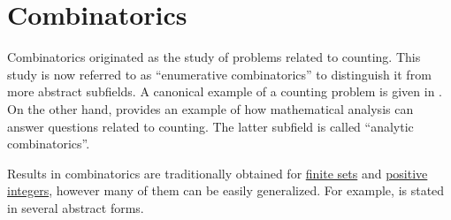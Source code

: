 \chapter{Combinatorics}\label{ch:combinatorics}

Combinatorics originated as the study of problems related to counting. This study is now referred to as \enquote{enumerative combinatorics} to distinguish it from more abstract subfields. A canonical example of a counting problem is given in . On the other hand,  provides an example of how mathematical analysis can answer questions related to counting. The latter subfield is called \enquote{analytic combinatorics}.

Results in combinatorics are traditionally obtained for \hyperref[def:set_finiteness]{finite sets} and \hyperref[def:integer_signum]{positive integers}, however many of them can be easily generalized. For example,  is stated in several abstract forms.

